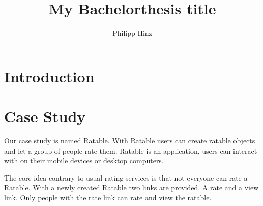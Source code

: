 \documentclass[
	ngerman,
	ruledheaders=section,   %
	class=report,		    %
	thesis={type=bachelor}, %
	accentcolor=9c,			%
	custommargins=false,    %
	marginpar=false,        %
	parskip=half-,          %
	fontsize=11pt,          %
]{tudapub}
\begin{document}

\title{My Bachelorthesis title}
\author[P. Hinz]{Philipp Hinz} %



\submissiondate{\today}
\examdate{\today}

\maketitle

\affidavit

\tableofcontents

\chapter{Introduction}

\chapter{Case Study}
Our case study is named Ratable. With Ratable users can create ratable objects and let a group of people rate them. Ratable is an application, users can interact with on their mobile devices or desktop computers. 

The core idea contrary to usual rating services is that not everyone can rate a Ratable. With a newly created Ratable two links are provided. A rate and a view link. Only people with the rate link can rate and view the ratable.
\end{document}
